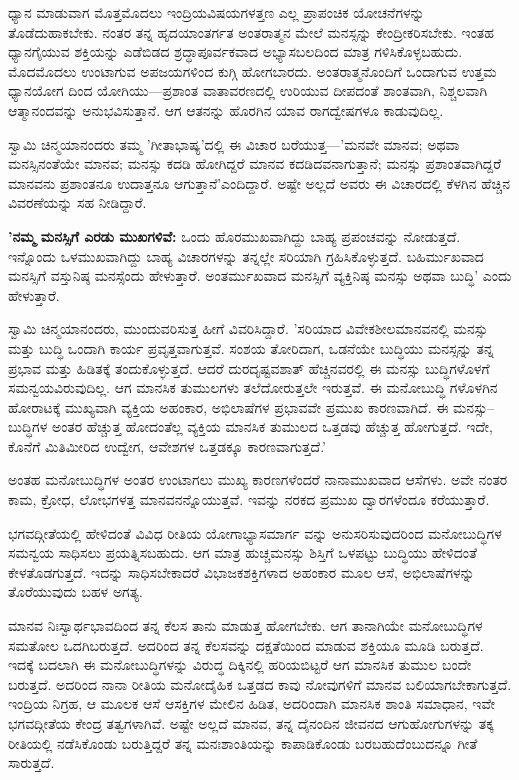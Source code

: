 ಧ್ಯಾನ ಮಾಡುವಾಗ ಮೊತ್ತಮೊದಲು ಇಂದ್ರಿಯವಿಷಯಗಳತ್ತಣ ಎಲ್ಲ ಪ್ರಾಪಂಚಿಕ ಯೋಚನೆಗಳನ್ನು ತೊಡೆದುಹಾಕಬೇಕು. ನಂತರ ತನ್ನ ಹೃದಯಾಂತರ್ಗತ ಅಂತರಾತ್ಮನ ಮೇಲೆ ಮನಸ್ಸನ್ನು ಕೇಂದ್ರೀಕರಿಸಬೇಕು. ಇಂತಹ ಧ್ಯಾನಗೈಯುವ ಶಕ್ತಿಯನ್ನು ಎಡೆಬಿಡದ ಶ್ರದ್ಧಾಪೂರ್ವಕವಾದ ಅಭ್ಯಾಸಬಲದಿಂದ ಮಾತ್ರ ಗಳಿಸಿಕೊಳ್ಳಬಹುದು. ಮೊದಮೊದಲು ಉಂಟಾಗುವ ಅಪಜಯಗಳಿಂದ ಕುಗ್ಗಿ ಹೋಗಬಾರದು. ಅಂತರಾತ್ಮನೊಂದಿಗೆ ಒಂದಾಗುವ ಉತ್ತಮ ಧ್ಯಾನಯೋಗ ದಿಂದ ಯೋಗಿಯು—ಪ್ರಶಾಂತ ವಾತಾವರಣದಲ್ಲಿ ಉರಿಯುವ ದೀಪದಂತೆ ಶಾಂತವಾಗಿ, ನಿಶ್ಚಲವಾಗಿ ಆತ್ಮಾನಂದವನ್ನು ಅನುಭವಿಸುತ್ತಾನೆ. ಆಗ ಆತನನ್ನು ಹೊರಗಿನ ಯಾವ ರಾಗದ್ವೇಷಗಳೂ ಕಾಡುವುದಿಲ್ಲ.

ಸ್ವಾಮಿ ಚಿನ್ಮಯಾನಂದರು ತಮ್ಮ 'ಗೀತಾಭಾಷ್ಯ'ದಲ್ಲಿ ಈ ವಿಚಾರ ಬರೆಯುತ್ತ—'ಮನವೇ ಮಾನವ; ಅಥವಾ ಮನಸ್ಸಿನಂತೆಯೇ ಮಾನವ; ಮನಸ್ಸು ಕದಡಿ ಹೋಗಿದ್ದರೆ ಮಾನವ ಕದಡಿದವನಾಗುತ್ತಾನೆ; ಮನಸ್ಸು ಪ್ರಶಾಂತವಾಗಿದ್ದರೆ ಮಾನವನು ಪ್ರಶಾಂತನೂ ಉದಾತ್ತನೂ ಆಗುತ್ತಾನೆ'ಎಂದಿದ್ದಾರೆ. ಅಷ್ಟೇ ಅಲ್ಲದೆ ಅವರು ಈ ವಿಚಾರದಲ್ಲಿ ಕೆಳಗಿನ ಹೆಚ್ಚಿನ ವಿವರಣೆಯನ್ನು ಸಹ ನೀಡಿದ್ದಾರೆ.

\textbf{'ನಮ್ಮ ಮನಸ್ಸಿಗೆ ಎರಡು ಮುಖಗಳಿವೆ:} ಒಂದು ಹೊರಮುಖವಾಗಿದ್ದು ಬಾಹ್ಯ ಪ್ರಪಂಚವನ್ನು ನೋಡುತ್ತದೆ. ಇನ್ನೊಂದು ಒಳಮುಖವಾಗಿದ್ದು ಬಾಹ್ಯ ವಿಚಾರಗಳನ್ನು ತನ್ನಲ್ಲೇ ಸರಿಯಾಗಿ ಗ್ರಹಿಸಿಕೊಳ್ಳುತ್ತದೆ. ಬಹಿರ್ಮುಖವಾದ ಮನಸ್ಸಿಗೆ ವಸ್ತುನಿಷ್ಠ ಮನಸ್ಸೆಂದು ಹೇಳುತ್ತಾರೆ. ಅಂತರ್ಮುಖವಾದ ಮನಸ್ಸಿಗೆ ವ್ಯಕ್ತಿನಿಷ್ಠ ಮನಸ್ಸು ಅಥವಾ ಬುದ್ಧಿ' ಎಂದು ಹೇಳುತ್ತಾರೆ.

ಸ್ವಾಮಿ ಚಿನ್ಮಯಾನಂದರು, ಮುಂದುವರಿಸುತ್ತ ಹೀಗೆ ವಿವರಿಸಿದ್ದಾರೆ. 'ಸರಿಯಾದ ವಿವೇಕಶೀಲಮಾನವನಲ್ಲಿ ಮನಸ್ಸು ಮತ್ತು ಬುದ್ಧಿ ಒಂದಾಗಿ ಕಾರ್ಯ ಪ್ರವೃತ್ತವಾಗುತ್ತವೆ. ಸಂಶಯ ತೋರಿದಾಗ, ಒಡನೆಯೇ ಬುದ್ಧಿಯು ಮನಸ್ಸನ್ನು ತನ್ನ ಪ್ರಭಾವ ಮತ್ತು ಹಿಡಿತಕ್ಕೆ ತಂದುಕೊಳ್ಳುತ್ತದೆ. ಆದರೆ ದುರದೃಷ್ಟವಶಾತ್ ಹೆಚ್ಚಿನವರಲ್ಲಿ ಈ ಮನಸ್ಸು ಬುದ್ಧಿಗಳೊಳಗೆ ಸಮನ್ವಯವಿರುವುದಿಲ್ಲ. ಆಗ ಮಾನಸಿಕ ತುಮುಲಗಳು ತಲೆದೋರುತ್ತಲೇ ಇರುತ್ತವೆ. ಈ ಮನೋಬುದ್ಧಿ ಗಳೊಳಗಿನ ಹೋರಾಟಕ್ಕೆ ಮುಖ್ಯವಾಗಿ ವ್ಯಕ್ತಿಯ ಅಹಂಕಾರ, ಅಭಿಲಾಷೆಗಳ ಪ್ರಭಾವವೇ ಪ್ರಮುಖ ಕಾರಣವಾಗಿದೆ. ಈ ಮನಸ್ಸು–ಬುದ್ಧಿಗಳ ಅಂತರ ಹೆಚ್ಚುತ್ತ ಹೋದಂತೆಲ್ಲ ವ್ಯಕ್ತಿಯ ಮಾನಸಿಕ ತುಮುಲದ ಒತ್ತಡವು ಹೆಚ್ಚುತ್ತ ಹೋಗುತ್ತದೆ. ಇದೇ, ಕೊನೆಗೆ ಮಿತಿಮೀರಿದ ಉದ್ವೇಗ, ಆವೇಶಗಳ ಒತ್ತಡಕ್ಕೂ ಕಾರಣವಾಗುತ್ತದೆ.'

ಅಂತಹ ಮನೋಬುದ್ಧಿಗಳ ಅಂತರ ಉಂಟಾಗಲು ಮುಖ್ಯ ಕಾರಣಗಳೆಂದರೆ ನಾನಾಮುಖವಾದ ಆಸೆಗಳು. ಅವೇ ನಂತರ ಕಾಮ, ಕ್ರೋಧ, ಲೋಭಗಳತ್ತ ಮಾನವನನ್ನೊಯುತ್ತವೆ. ಇವನ್ನು ನರಕದ ಪ್ರಮುಖ ದ್ವಾರಗಳೆಂದೂ ಕರೆಯುತ್ತಾರೆ.

ಭಗವದ್ಗೀತೆಯಲ್ಲಿ ಹೇಳಿದಂತೆ ವಿವಿಧ ರೀತಿಯ ಯೋಗಾಭ್ಯಾಸಮಾರ್ಗ ವನ್ನು ಅನುಸರಿಸುವುದರಿಂದ ಮನೋಬುದ್ಧಿಗಳ ಸಮನ್ವಯ ಸಾಧಿಸಲು ಪ್ರಯತ್ನಿಸಬಹುದು. ಆಗ ಮಾತ್ರ ಹುಚ್ಚಮನಸ್ಸು ಶಿಸ್ತಿಗೆ ಒಳಪಟ್ಟು ಬುದ್ಧಿಯು ಹೇಳಿದಂತೆ ಕೇಳತೊಡಗುತ್ತದೆ. ಇದನ್ನು ಸಾಧಿಸಬೇಕಾದರೆ ವಿಭಾಜಕಶಕ್ತಿಗಳಾದ ಅಹಂಕಾರ ಮೂಲ ಆಸೆ, ಅಭಿಲಾಷೆಗಳನ್ನು ತೊರೆಯುವುದು ಬಹಳ ಅಗತ್ಯ.

ಮಾನವ ನಿಃಸ್ವಾರ್ಥಭಾವದಿಂದ ತನ್ನ ಕೆಲಸ ತಾನು ಮಾಡುತ್ತ ಹೋಗಬೇಕು. ಆಗ ತಾನಾಗಿಯೇ ಮನೋಬುದ್ಧಿಗಳ ಸಮತೋಲ ಒದಗಿಬರುತ್ತದೆ. ಅದರಿಂದ ತನ್ನ ಕೆಲಸವನ್ನು ದಕ್ಷತೆಯಿಂದ ಮಾಡುವ ಶಕ್ತಿಯೂ ಮೂಡಿ ಬರುತ್ತದೆ. ಇದಕ್ಕೆ ಬದಲಾಗಿ ಈ ಮನೋಬುದ್ಧಿಗಳನ್ನು ವಿರುದ್ಧ ದಿಕ್ಕಿನಲ್ಲಿ ಹರಿಯಬಿಟ್ಟರೆ ಆಗ ಮಾನಸಿಕ ತುಮುಲ ಬಂದೇ ಬರುತ್ತದೆ. ಅದರಿಂದ ನಾನಾ ರೀತಿಯ ಮನೋದೈಹಿಕ ಒತ್ತಡದ ಕಾವು ನೋವುಗಳಿಗೆ ಮಾನವ ಬಲಿಯಾಗಬೇಕಾಗುತ್ತದೆ. ಇಂದ್ರಿಯ ನಿಗ್ರಹ, ಆ ಮೂಲಕ ಆಸೆ ಆಸಕ್ತಿಗಳ ಮೇಲಿನ ಹಿಡಿತ, ಅದರಿಂದಾಗಿ ಮಾನಸಿಕ ಶಾಂತಿ ಸಮಾಧಾನ, ಇವೇ ಭಗವದ್ಗೀತೆಯ ಕೇಂದ್ರ ತತ್ವಗಳಾಗಿವೆ. ಅಷ್ಟೇ ಅಲ್ಲದೆ ಮಾನವ, ತನ್ನ ದೈನಂದಿನ ಜೀವನದ ಆಗುಹೋಗುಗಳನ್ನು ತಕ್ಕ ರೀತಿಯಲ್ಲಿ ನಡೆಸಿಕೊಂಡು ಬರುತ್ತಿದ್ದರೆ ತನ್ನ ಮನಃಶಾಂತಿಯನ್ನು ಕಾಪಾಡಿಕೊಂಡು ಬರಬಹುದೆಂಬುದನ್ನೂ ಗೀತೆ ಸಾರುತ್ತದೆ.

